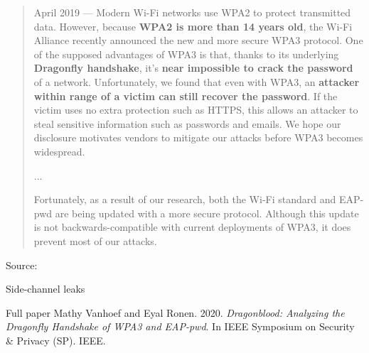 \documentclass[Screen16to9,17pt]{foils}
\begin{document}
\begin{list2}
    \item
\end{list2}




\begin{quote}\small
April 2019 — Modern Wi-Fi networks use WPA2 to protect transmitted data. However, because {\bf WPA2 is more than 14 years old}, the Wi-Fi Alliance recently announced the new and more secure WPA3 protocol. One of the supposed advantages of WPA3 is that, thanks to its underlying {\bf Dragonfly handshake}, it's {\bf near impossible to crack the password} of a network. Unfortunately, we found that even with WPA3, an {\bf attacker within range of a victim can still recover the password}. If the victim uses no extra protection such as HTTPS, this allows an attacker to steal sensitive information such as passwords and emails. We hope our disclosure motivates vendors to mitigate our attacks before WPA3 becomes widespread.

...

Fortunately, as a result of our research, both the Wi-Fi standard and EAP-pwd are being updated with a more secure protocol. Although this update is not backwards-compatible with current deployments of WPA3, it does prevent most of our attacks.
\end{quote}
Source: 


\begin{list2}
\item Side-channel leaks
\item Full paper Mathy Vanhoef and Eyal Ronen. 2020. \emph{Dragonblood: Analyzing the Dragonfly Handshake of WPA3 and EAP-pwd}. In IEEE Symposium on Security \& Privacy (SP). IEEE.

\end{list2}


\end{document}
